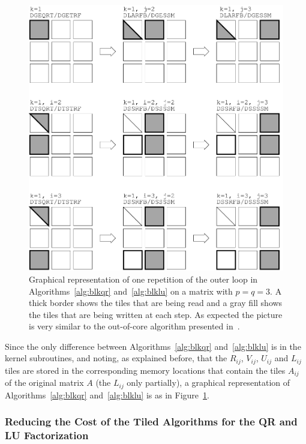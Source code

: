 \documentclass{article}
\begin{document}
\begin{figure}[!h]
  \begin{center}
    \includegraphics[width=\textwidth]{images/blk_alg_col_bw}
    \caption{\label{fig:blk_alg}Graphical representation of one
      repetition of the outer loop in Algorithms~\ref{alg:blkqr}
      and~\ref{alg:blklu} on a matrix with $p=q=3$. A thick border
      shows the tiles that are being read and a gray fill shows the
      tiles that are being written at each step.  As expected the
      picture is very similar to the out-of-core algorithm presented
      in~\cite{1055534}.  }
\end{center}
\end{figure}


Since the only difference between Algorithms~\ref{alg:blkqr}
and~\ref{alg:blklu} is in the kernel subroutines, and noting, as
explained before, that the $R_{ij}$, $V_{ij}$, $U_{ij}$ and $L_{ij}$
tiles are stored in the corresponding memory locations that contain
the tiles $A_{ij}$ of the original matrix $A$ (the $L_{ij}$ only
partially), a graphical representation of Algorithms~\ref{alg:blkqr}
and~\ref{alg:blklu} is as in Figure~\ref{fig:blk_alg}.

\subsubsection{Reducing the Cost of the Tiled Algorithms for the QR
  and LU Factorization}
\label{sec:cost}
\end{document}

